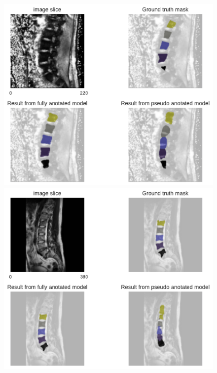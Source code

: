 \begin{figure}
    \centering
    \begin{minipage}{.99\textwidth}
        \includegraphics[width=.99\textwidth]{images/fullvsPseudo_MyoSegmenTUM_024_023.pdf}
    \end{minipage} 
    \vspace{2 mm}
    \begin{minipage}{.99\textwidth}
        \includegraphics[width=.99\textwidth]{images/fullvsPseudo_USiegen_012_024.pdf}

\end{minipage}
\end{figure}
